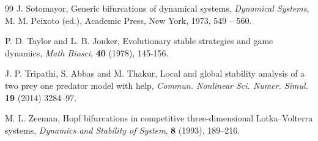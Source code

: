 \documentclass[12pt]{article}
\theoremstyle{definition}
\begin{document}
\begin{thebibliography}{99}
	\newblock J. Sotomayor,
	\newblock Generic bifurcations of dynamical systems,
	\newblock \emph{Dynamical Systems}, M. M. Peixoto (ed.), Academic Press, New York, 1973, 549 -- 560.
	
	P. D. Taylor and L. B. Jonker, 
	\newblock Evolutionary stable strategies and game dynamics,
	\newblock \emph{Math Biosci}, \textbf{40} (1978), 145-156.
	
	 J. P. Tripathi, S. Abbas and M. Thakur,
	\newblock Local and global stability analysis of a two prey one
		predator model with help,
	\newblock \emph{Commun. Nonlinear Sci. Numer. Simul.}  \textbf{19} (2014) 3284–97.
	
	 M. L. Zeeman,
	\newblock Hopf bifurcations in competitive three-dimensional Lotka–Volterra systems, \newblock \emph{Dynamics and Stability of System}, \textbf{8} (1993), 189–216.
	
\end{thebibliography}
\end{document}
